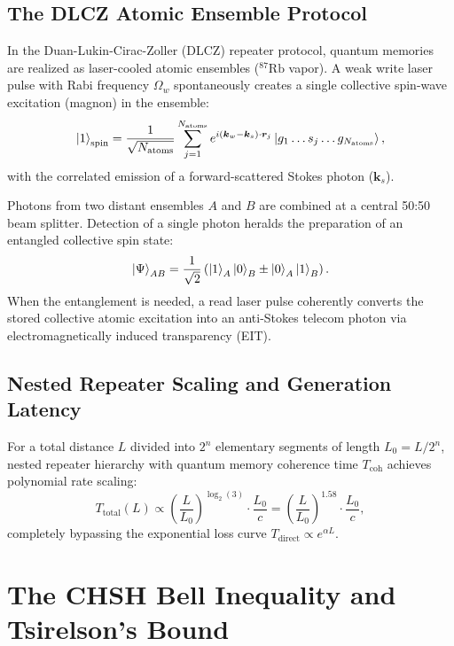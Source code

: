 \subsection{The DLCZ Atomic Ensemble Protocol}
In the Duan-Lukin-Cirac-Zoller (DLCZ) repeater protocol, quantum memories are realized as laser-cooled atomic ensembles ($^{87}\text{Rb}$ vapor). A weak write laser pulse with Rabi frequency $\Omega_w$ spontaneously creates a single collective spin-wave excitation (magnon) in the ensemble:
\begin{equation}
    \ket{1}_{\text{spin}} = \frac{1}{\sqrt{N_{\text{atoms}}}} \sum_{j=1}^{N_{\text{atoms}}} e^{i (\bm{k}_w - \bm{k}_s) \cdot \bm{r}_j} \ket{g_1 \dots s_j \dots g_{N_{\text{atoms}}}},
\end{equation}
with the correlated emission of a forward-scattered Stokes photon ($\bm{k}_s$).

Photons from two distant ensembles $A$ and $B$ are combined at a central 50:50 beam splitter. Detection of a single photon heralds the preparation of an entangled collective spin state:
\begin{equation}
    \ket{\Psi}_{AB} = \frac{1}{\sqrt{2}} \left( \ket{1}_A \ket{0}_B \pm \ket{0}_A \ket{1}_B \right).
\end{equation}
When the entanglement is needed, a read laser pulse coherently converts the stored collective atomic excitation into an anti-Stokes telecom photon via electromagnetically induced transparency (EIT).

\subsection{Nested Repeater Scaling and Generation Latency}
For a total distance $L$ divided into $2^n$ elementary segments of length $L_0 = L / 2^n$, nested repeater hierarchy with quantum memory coherence time $T_{\text{coh}}$ achieves polynomial rate scaling:
\begin{equation}
    T_{\text{total}}(L) \propto \left( \frac{L}{L_0} \right)^{\log_2(3)} \cdot \frac{L_0}{c} = \left( \frac{L}{L_0} \right)^{1.58} \cdot \frac{L_0}{c},
\end{equation}
completely bypassing the exponential loss curve $T_{\text{direct}} \propto e^{\alpha L}$.

\section{The CHSH Bell Inequality and Tsirelson's Bound}
\label{sec:chsh_bell_proof}

